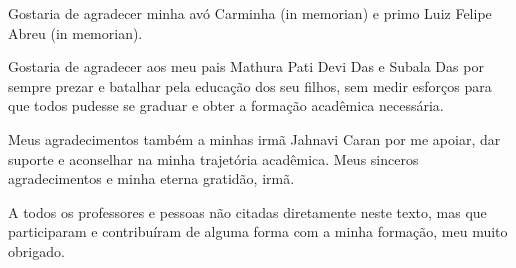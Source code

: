 \begin{agradecimentos}
	Gostaria de agradecer minha avó Carminha (in memorian) e primo Luiz Felipe Abreu (in memorian).

			Gostaria de agradecer aos meu pais Mathura Pati Devi Das e Subala Das por sempre prezar e batalhar pela educação dos seu filhos, sem medir esforços para que todos pudesse se graduar e obter a formação acadêmica necessária.

			Meus agradecimentos também a minhas irmã Jahnavi Caran por me apoiar, dar suporte e aconselhar na minha trajetória acadêmica. Meus sinceros agradecimentos e minha eterna gratidão, irmã.


			A todos os professores e pessoas não citadas diretamente neste texto, mas que participaram e contribuíram de alguma forma com a minha formação, meu muito obrigado.

\end{agradecimentos}

